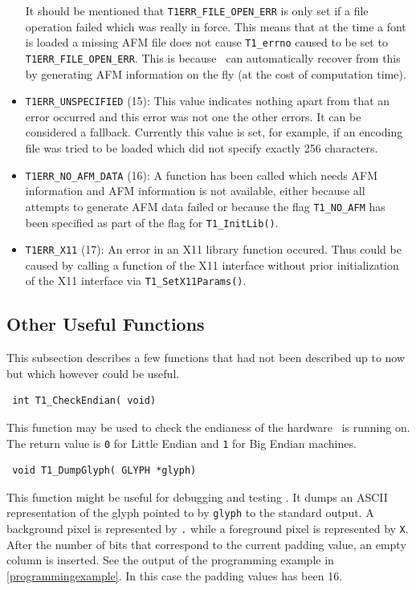 \begin{itemize}
  It should be mentioned that \verb+T1ERR_FILE_OPEN_ERR+ is only set if a file
  operation failed which was really in force. This means that at the time a
  font is loaded a missing AFM file does not cause \verb+T1_errno+ caused to
  be set to \verb+T1ERR_FILE_OPEN_ERR+. This is because \tonelib\ can
  automatically recover from this by generating AFM information on the fly (at
  the cost of computation time).
\item \verb+T1ERR_UNSPECIFIED+ (15): This value indicates nothing apart from
  that an error occurred and this error was not one the other errors. It can
  be considered a fallback. Currently this value is set, for example, if an
  encoding file was tried to be loaded which did not specify exactly 256
  characters. 
\item \verb+T1ERR_NO_AFM_DATA+ (16): A function has been called which needs
  AFM information and AFM information is not available, either because all
  attempts to generate AFM data failed or because the flag \verb+T1_NO_AFM+
  has been specified as part of the flag for \verb+T1_InitLib()+. 
\item \verb+T1ERR_X11+ (17): An error in an X11 library function occured. Thus
  could be caused by calling a function of the X11 interface without prior
  initialization of the X11 interface via \verb+T1_SetX11Params()+.
\end{itemize}


\subsection{Other Useful Functions}
\label{otherfunctions}
This subsection describes a few functions that had not been described up to
now but which however could be useful.

\precorr
\begin{verbatim}
 int T1_CheckEndian( void)
\end{verbatim}\postcorr
This function may be used to check the endianess of the hardware \tonelib\ is
running on. The return value is \verb+0+ for Little Endian and \verb+1+ for
Big Endian machines.

\precorr
\begin{verbatim}
 void T1_DumpGlyph( GLYPH *glyph)
\end{verbatim}\postcorr
This function might be useful for debugging and testing \tonelib. It dumps an
ASCII representation of the glyph pointed to by \verb+glyph+ to the standard
output. A background pixel is represented by \verb+.+ while a foreground pixel
is represented by \verb+X+. After the number of bits that correspond to the
current padding value, an empty column is inserted. See the output of the
programming example in \ref{programmingexample}. In this case the padding
values has been 16.

